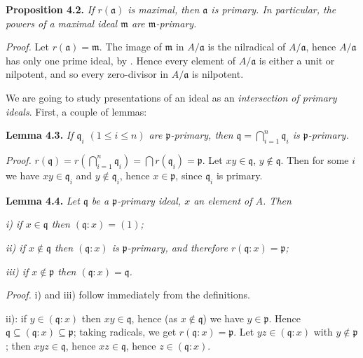 \noindent\textbf{Proposition 4.2.} \emph{If \(r(\mathfrak a)\) is maximal, then \(\mathfrak a\) is primary. In particular, the powers of a maximal ideal \(\mathfrak m\) are \(\mathfrak m\)-primary.}

\noindent\emph{Proof.} Let \(r(\mathfrak a)=\mathfrak m\). The image of \(\mathfrak m\) in \(A/\mathfrak a\) is the nilradical of \(A/\mathfrak a\), hence \(A/\mathfrak a\) has only one prime ideal, by . Hence every element of \(A/\mathfrak a\) is either a unit or nilpotent, and so every zero-divisor in \(A/\mathfrak a\) is nilpotent. \proofbox

We are going to study presentations of an ideal as an \emph{intersection of primary ideals}. First, a couple of lemmas:

\noindent\textbf{Lemma 4.3.} \emph{If \(\mathfrak q_i\) \((1\leq i\leq n)\) are \(\mathfrak p\)-primary, then \(\mathfrak q=\bigcap_{i=1}^n\mathfrak q_i\) is \(\mathfrak p\)-primary.}

\noindent\emph{Proof.} \(r(\mathfrak q)=r(\bigcap_{i=1}^n\mathfrak q_i)=\bigcap r(\mathfrak q_i)=\mathfrak p\). Let \(xy\in\mathfrak q\), \(y\notin\mathfrak q\). Then for some \(i\) we have \(xy\in\mathfrak q_i\) and \(y\notin\mathfrak q_i\), hence \(x\in\mathfrak p\), since \(\mathfrak q_i\) is primary. \proofbox

\noindent\textbf{Lemma 4.4.} \emph{Let \(\mathfrak q\) be a \(\mathfrak p\)-primary ideal, \(x\) an element of \(A\). Then}

\emph{i) if \(x\in\mathfrak q\) then \((\mathfrak q:x)=(1)\);}

\emph{ii) if \(x\notin\mathfrak q\) then \((\mathfrak q:x)\) is \(\mathfrak p\)-primary, and therefore \(r(\mathfrak q:x)=\mathfrak p\);}

\emph{iii) if \(x\notin\mathfrak p\) then \((\mathfrak q:x)=\mathfrak q\).}

\noindent\emph{Proof.} i) and iii) follow immediately from the definitions.

ii): if \(y\in(\mathfrak q:x)\) then \(xy\in\mathfrak q\), hence (as \(x\notin\mathfrak q\)) we have \(y\in\mathfrak p\). Hence \(\mathfrak q\subseteq(\mathfrak q:x)\subseteq\mathfrak p\); taking radicals, we get \(r(\mathfrak q:x)=\mathfrak p\). Let \(yz\in(\mathfrak q:x)\) with \(y\notin\mathfrak p\); then \(xyz\in\mathfrak q\), hence \(xz\in\mathfrak q\), hence \(z\in(\mathfrak q:x)\). \proofbox

